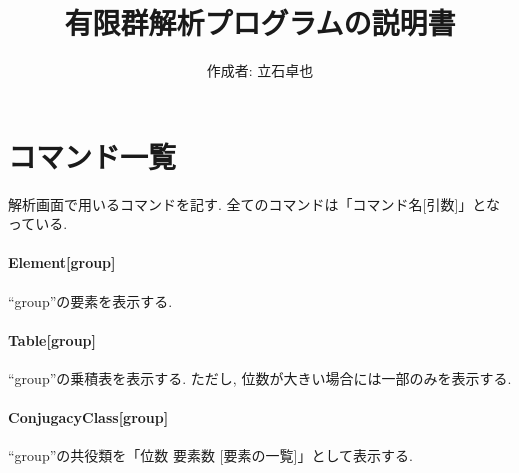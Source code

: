 \documentclass[11pt, a4paper]{jsarticle}
\title{
有限群解析プログラムの説明書
}
\author{
作成者: 立石卓也
}
\begin{document}
\newcommand{\Slash}[1]{{\ooalign{\hfil/\hfil\crcr$#1$}}}		%
\maketitle
\section{コマンド一覧}
解析画面で用いるコマンドを記す.
全てのコマンドは「コマンド名[引数]」となっている.


\paragraph{Element[group]}
``group''の要素を表示する.

\paragraph{Table[group]}
``group''の乗積表を表示する.
ただし, 位数が大きい場合には一部のみを表示する.

\paragraph{ConjugacyClass[group]}
``group''の共役類を「位数 要素数 [要素の一覧]」として表示する.




\end{document}

